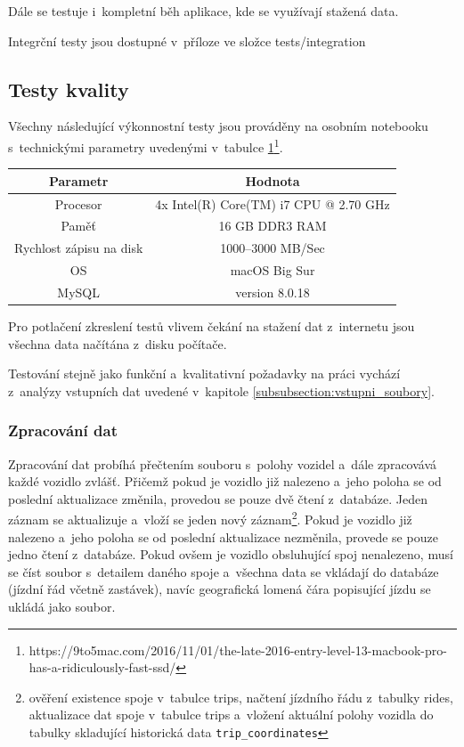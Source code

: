 \bigbreak

Dále se testuje i~kompletní běh aplikace, kde se využívají stažená data.

\bigbreak

Integrční testy jsou dostupné v~příloze ve složce tests/integration


\subsection{Testy kvality}


Všechny následující výkonnostní testy jsou prováděny na osobním notebooku s~technickými parametry uvedenými v~tabulce \ref{table:hw}\footnote{https://9to5mac.com/2016/11/01/the-late-2016-entry-level-13-macbook-pro-has-a-ridiculously-fast-ssd/}.


\begin{center}
   \begin{table}[ht]
\centering
\begin{tabular}{|c|c|}
\hline
Parametr & Hodnota \\ \hline \hline
Procesor & 4x Intel(R) Core(TM) i7 CPU @ 2.70 GHz\\ \hline
Paměť & 16 GB DDR3 RAM  \\  \hline
Rychlost zápisu na disk & 1000--3000 MB/Sec \\ \hline
OS & macOS Big Sur\\ \hline
MySQL & version 8.0.18\\ \hline
\end{tabular}
\label{table:hw}
\end{table}
\end{center}


\bigbreak

Pro potlačení zkreslení testů vlivem čekání na stažení dat z~internetu jsou všechna data načítána z~disku počítače.


\bigbreak

Testování stejně jako funkční a~kvalitativní požadavky na práci vychází z~analýzy vstupních dat uvedené v~kapitole \ref{subsubsection:vstupni_soubory}.


\subsubsection{Zpracování dat}

Zpracování dat probíhá přečtením souboru s~polohy vozidel a~dále zpracovává každé vozidlo zvlášť. Přičemž pokud je vozidlo již nalezeno a~jeho poloha se od poslední aktualizace změnila, provedou se pouze dvě čtení z~databáze. Jeden záznam se aktualizuje a~vloží se jeden nový záznam\footnote{ověření existence spoje v~tabulce trips, načtení jízdního řádu z~tabulky rides, aktualizace dat spoje v~tabulce trips a~vložení aktuální polohy vozidla do tabulky skladující historická data \texttt{trip\_coordinates}}. Pokud je vozidlo již nalezeno a~jeho poloha se od poslední aktualizace nezměnila, provede se pouze jedno čtení z~databáze. Pokud ovšem je vozidlo obsluhující spoj nenalezeno, musí se číst soubor s~detailem daného spoje a~všechna data se vkládají do databáze (jízdní řád včetně zastávek), navíc geografická lomená čára popisující jízdu se ukládá jako soubor.


